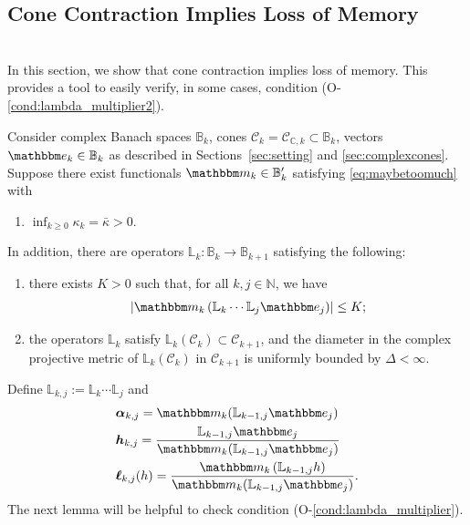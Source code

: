\documentclass{amsart}
\numberwithin{equation}{section}
\newcommand\cC{{\mathcal C}}
\newcommand\bB{{\mathbb B}}
\newcommand\bC{{\mathbb C}}
\newcommand\bL{{\mathbb L}}
\newcommand\bN{{\mathbb N}}
\newcommand{\bbe}{\mathbbm e}
\newcommand{\bbm}{\mathbbm m}
\begin{document}

\subsection{Cone Contraction Implies Loss of Memory}
\label{sec:memory loss}\ \\


In this section, we show that cone contraction implies loss of memory.
This provides a tool to easily verify, in some cases, condition (O-\ref{cond:lambda_multiplier2}).

Consider complex Banach spaces $\bB_k$, cones $\cC_k = \cC_{\bC, k} \subset \bB_k$, vectors $\bbe_k\in\bB_k$ as described in Sections~\ref{sec:setting}  and \ref{sec:complexcones}.
Suppose there exist functionals $\bbm_k\in\bB_k'$ 
satisfying \eqref{eq:maybetoomuch} with
\begin{enumerate}
  \item[a)] $\displaystyle \inf_{k \ge 0} \kappa_k = \bar \kappa > 0$. 
\end{enumerate}
In addition, 
there are operators $\bL_{k}:\bB_k\to\bB_{k+1}$ satisfying the following:
\begin{enumerate}
\item[b)] there exists $K>0$ such that, for all $k,j\in\bN$, we have 
\[
\left|\bbm_k\left(\bL_{k}\cdots \bL_{j} \bbe_j\right)\right|\leq K;
\]
  \item[c)] the operators $\bL_{k}$ satisfy $\bL_{k}(\cC_{k}) \subset \cC_{k+1}$, and the
  diameter in the complex projective metric of $\bL_{k}(\cC_{k})$ in $\cC_{k+1}$
  is uniformly bounded by $\Delta< \infty$.
\end{enumerate}
Define $\bL_{k,j} :=\bL_{k}\cdots \bL_{j}$ and  
\begin{equation}\label{eq:alpha-h-ell}
\begin{split}
&\boldsymbol{\alpha}_{k,j}=\bbm_k(\bL_{k-1,j} \bbe_j)\\
&\boldsymbol{h}_{k,j}=\frac{\bL_{k-1,j} \bbe_j}{\bbm_k(\bL_{k-1,j}\bbe_j)}\\
&\boldsymbol{\ell}_{k,j}(h)=\frac{\bbm_k\left(\bL_{k-1,j} h\right)}{\bbm_k(\bL_{k-1,j} \bbe_j)}.
\end{split}
\end{equation}
The next lemma will be helpful to check condition (O-\ref{cond:lambda_multiplier}).
\end{document}
